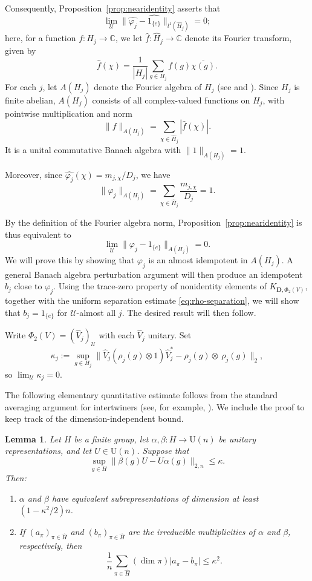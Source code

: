 \documentclass[12pt]{amsart}
\numberwithin{equation}{section}
\newtheorem{lem}[thm]{Lemma}
\theoremstyle{definition}
\def\cal{\mathcal}
\newcommand\cU{{\cal U}}
\def \u{\mathcal U}
\begin{document}
Consequently, Proposition~\ref{prop:nearidentity}
asserts that
\[
\lim_{\mathcal U}
\|\widehat{\varphi_j}-\widehat{1_{\{e\}}}\|
_{l^1(\widehat H_j)}=0;
\]
here, for a function $f:H_j\to\mathbb C$, we let
$\widehat f:\widehat H_j\to\mathbb C$ denote
its Fourier transform, given by
\[
\widehat f(\chi)
=\frac1{|H_j|}\sum_{g\in H_j}
f(g)\overline{\chi(g)}.
\]
For each $j$, let $A(H_j)$ denote the Fourier algebra
of $H_j$ (see \cite{Eymard64Fourier} and
\cite[Chapter~2]{Kaniuth-Lau18Fourier}).
Since $H_j$ is finite abelian, $A(H_j)$ consists
of all complex-valued functions on $H_j$, with
pointwise multiplication and norm
\[
\|f\|_{A(H_j)}
=\sum_{\chi\in\widehat H_j}|\widehat f(\chi)|.
\]
It is a unital commutative Banach algebra with
$\|1\|_{A(H_j)}=1$.

Moreover, since
$\widehat{\varphi_j}(\chi)=m_{j,\chi}/D_j$,
we have
\[
\|\varphi_j\|_{A(H_j)}
=\sum_{\chi\in\widehat H_j}
\frac{m_{j,\chi}}{D_j}=1.
\]

By the definition of the Fourier algebra norm,
Proposition~\ref{prop:nearidentity} is thus
equivalent to
\[
\lim_{\mathcal U}
\|\varphi_j-1_{\{e\}}\|_{A(H_j)}=0.
\]
We will prove this by showing that
$\varphi_j$ is an almost idempotent in
$A(H_j)$. A general Banach algebra
perturbation argument will then produce
an idempotent $b_j$ close to $\varphi_j$.
Using the trace-zero property of nonidentity
elements of $K_{\mathbf D,\Phi_2(V)}$,
together with the uniform separation
estimate \eqref{eq:rho-separation}, we will
show that $b_j=1_{\{e\}}$ for
$\mathcal U$-almost all $j$.
The desired result will then follow.

Write $\Phi_{2}(V)=(\hat{V}_j)_\u$ with each $\hat V_j$ unitary.  Set $$\kappa_j:=\sup_{g\in H_j}\|\hat{V}_j(\rho_j(g)\otimes 1)\hat{V}_j^*-\rho_j(g)\otimes\ \rho_j(g)\|_2,$$ so $\lim_\cU \kappa_j=0$.

The following elementary quantitative estimate
follows from the standard averaging argument
for intertwiners (see, for example,
\cite[Section~5.1]{folland2016course}).
We include the proof to keep track of the
dimension-independent bound.
\begin{lem} \label{lem:approxintertwiner}
Let $H$ be a finite group, let
$\alpha,\beta:H\to\mathrm U(n)$ be unitary
representations, and let $U\in\mathrm U(n)$.
Suppose that
\[
\sup_{g\in H}
\|\beta(g)U-U\alpha(g)\|_{2,n}\le\kappa.
\]
Then:
\begin{enumerate}
\item $\alpha$ and $\beta$ have equivalent
subrepresentations of dimension at least
$(1-\kappa^2/2)n$.

\item If $(a_\pi)_{\pi\in\widehat H}$ and
$(b_\pi)_{\pi\in\widehat H}$ are the irreducible
multiplicities of $\alpha$ and $\beta$,
respectively, then
\[
\frac1n\sum_{\pi\in\widehat H}
(\dim\pi)|a_\pi-b_\pi|\le\kappa^2.
\]
\end{enumerate}
\end{lem}
\end{document}
